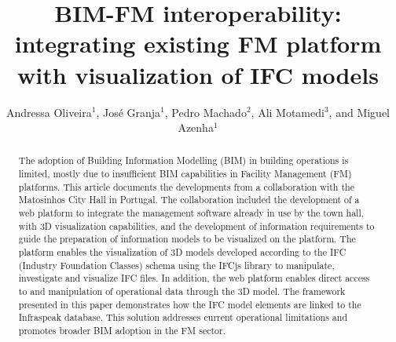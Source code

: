 \documentclass[a4paper, 10pt, twocolumn, twoside]{article}
\begin{document}
\linespread{0.5}

\title{BIM-FM interoperability: integrating existing FM platform with visualization of IFC models}

\author{Andressa Oliveira$^{1}$, José Granja$^1$, Pedro Machado$^2$, Ali Motamedi$^3$, and Miguel Azenha$^1$}




\maketitle 
\thispagestyle{fancy} 
\pagestyle{fancy}

\begin{abstract}
The adoption of Building Information Modelling (BIM) in building operations is limited, mostly due to insufficient BIM capabilities in Facility Management (FM) platforms. This article documents the developments from a collaboration with the Matosinhos City Hall in Portugal. The collaboration included the development of a web platform to integrate the management software already in use by the town hall, with 3D visualization capabilities, and the development of information requirements to guide the preparation of information models to be visualized on the platform. The platform enables the visualization of 3D models developed according to the IFC (Industry Foundation Classes) schema using the IFCjs library to manipulate, investigate and visualize IFC files. In addition, the web platform enables direct access to and manipulation of operational data through the 3D model. The framework presented in this paper demonstrates how the IFC model elements are linked to the Infraspeak database. This solution addresses current operational limitations and promotes broader BIM adoption in the FM sector.
\end{abstract}
\end{document}
